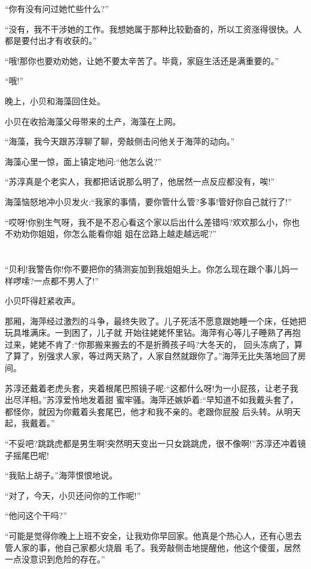 \documentclass[11pt,a4paper,onecolumn]{article}
\begin{document}
``你有没有问过她忙些什么?''

``没有，我不干涉她的工作。我想她属于那种比较勤奋的，所以工资涨得很快。人都是要付出才有收获的。''

``哦!那你也要劝劝她，让她不要太辛苦了。毕竟，家庭生活还是满重要的。''

``哦!''

晚上，小贝和海藻回住处。

小贝在收拾海藻父母带来的土产，海藻在上网。

``海藻，我今天跟苏淳聊了聊，旁敲侧击问他关于海萍的动向。''

海藻心里一惊，面上镇定地问:``他怎么说?''

``苏淳真是个老实人，我都把话说那么明了，他居然一点反应都没有，唉!''

海藻恼怒地冲小贝发火:``我家的事情，要你管什么管?多事!管好你自己就行了!''

``哎呀!你别生气呀，我不是不忍心看这个家以后出什么差错吗?欢欢那么小，你也不劝劝你姐姐，你怎么能看你姐
姐在岔路上越走越远呢?''

\section[\thesection]{}

``贝利!我警告你!你不要把你的猜测妄加到我姐姐头上。你怎么现在跟个事儿妈一样啰嗦?一点都不男人了!''

小贝吓得赶紧收声。

那厢，海萍经过激烈的斗争，最终失败了。儿子死活不愿意跟她睡一个床，任她把玩具堆满床。一到困了，儿子就
开始往姥姥怀里钻。海萍有心等儿子睡熟了再抱过来，姥姥不肯了:``你那搬来搬去的不是折腾孩子吗?大冬天的，
回头冻病了，算了算了，别强求人家，等过两天熟了，人家自然就跟你了。''海萍无比失落地回了房间。

苏淳还戴着老虎头套，夹着根尾巴照镜子呢:``这都什么呀!为一小屁孩，让老子我出尽洋相。''苏淳爱怜地发着甜
蜜牢骚。海萍还嫉妒着:``早知道不如我戴头套了，都怪你，就因为你戴着头套尾巴，他才和我不亲的。老跟你屁股
后头转。从明天起，我戴着。''

``不妥吧?跳跳虎都是男生啊!突然明天变出一只女跳跳虎，很不像啊!''苏淳还冲着镜子摇尾巴呢!

``我贴上胡子。''海萍恨恨地说。

``对了，今天，小贝还问你的工作呢!''

``他问这个干吗?''

``可能是觉得你晚上上班不安全，让我劝你早回家。他真是个热心人，还有心思去管人家的事，他自己家都火烧眉
毛了。我旁敲侧击地提醒他，他这个傻蛋，居然一点没意识到危险的存在。''
\end{document}
